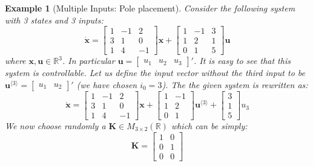 \documentclass[a4paper,10pt,oneside]{book}
\newtheorem{example}{Example}
\begin{document}
\begin{example}[Multiple Inputs: Pole placement]
 Consider the following system with 3 states and 3 inputs:
\begin{equation}
 \dot{\mathbf{x}}=\left[ {\begin{array}{ccc}
      1&-1&2\\3&1&0\\1&4&-1
\end{array} } \right]\mathbf{x}+\left[ {\begin{array}{ccc}     
1&-1&3\\1&2&1\\0&1&5
\end{array} } \right]\mathbf{u}
\end{equation}
where $\mathbf{x},\mathbf{u}\in \mathbb{R}^3$. In particular $\mathbf{u}=\left[ {\begin{array}{ccc}u_1&u_2&u_3\end{array} } \right]'$. It is easy to see that this system is controllable. Let us define the input vector without the third input to be $\mathbf{u}^{\langle3 \rangle}=\left[ {\begin{array}{cc}u_1&u_2\end{array} } \right]'$ (we have chosen $i_0=3$). The the given system is rewritten as:
\begin{equation}
 \dot{\mathbf{x}}=\left[ {\begin{array}{ccc}
      1&-1&2\\3&1&0\\1&4&-1
\end{array} } \right]\mathbf{x}+\left[ {\begin{array}{ccc}     
1&-1\\1&2\\0&1
\end{array} } \right]\mathbf{u}^{\langle3 \rangle}+\left[ {\begin{array}{c}     
3\\1\\5
\end{array} } \right]u_3
\end{equation}
We now choose randomly a $\mathbf{K}\in M_{3\times 2}(\mathbb{R})$ which can be simply:
\begin{equation}
 \mathbf{K}=\left[ {\begin{array}{cc}
1&0\\0&1\\0&0
\end{array} } \right]
\end{equation}

\end{example}
\end{document}
